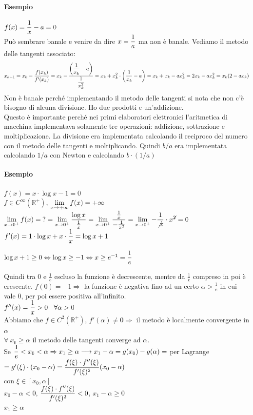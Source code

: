 \documentclass[10pt]{book}
\begin{document}
\paragraph{Esempio} $f(x) = \mathlarger{\frac{1}{x}} - a = 0$\\
Può sembrare banale e venire da dire $x = \mathlarger{\frac{1}{a}}$ ma non è banale. Vediamo il metodo delle tangenti associato:\\
$$x_{k+1} = x_k - \frac{f(x_k)}{f'(x_k)} = x_k -  \frac{\mathlarger{\left(\frac{1}{x_k} - a\right)}}{\mathlarger{\frac{1}{x_k^2}}} = x_k + x_k^2\cdot\left(\frac{1}{x_k} - a \right) = x_k + x_k - ax_k^2 = 2x_k - ax_k^2 = x_k(2 - ax_k)$$
Non è banale perché implementando il metodo delle tangenti si nota che non c'è bisogno di alcuna divisione. Ho due prodotti e un'addizione.\\
Questo è importante perché nei primi elaboratori elettronici l'aritmetica di macchina implementava solamente tre operazioni: addizione, sottrazione e moltiplicazione. La divisione era implementata calcolando il reciproco del numero con il metodo delle tangenti e moltiplicando. Quindi $b/a$ era implementata calcolando $1/a$ con Newton e calcolando $b\cdot(1/a)$
\paragraph{Esempio} $f(x) = x\cdot\log x - 1 = 0$\\
$f \in C^\infty(\mathbb{R}^+)$, $\mathlarger{\lim_{x\to+\infty}f(x) = +\infty}$\\
$\mathlarger{\lim_{x\to0^+}f(x) =\: ?} = \mathlarger{\lim_{x\to0^+} \frac{\log x}{\frac{1}{x}}} = \mathlarger{\lim_{x\to0^+} \frac{\frac{1}{x}}{-\frac{1}{x^2}}} = \mathlarger{\lim_{x\to0^+} -\frac{1}{\not x}\cdot x^{\not 2}} = 0$\\
$f'(x) = 1\cdot\log x + x\cdot\mathlarger{\frac{1}{x}} = \log x + 1$
\begin{list}{}{}
	\item $\log x + 1 \geq 0 \Leftrightarrow \log x \geq -1 \Leftrightarrow x \geq e^{-1} = \mathlarger{\frac{1}{e}}$
\end{list}
Quindi tra $0$ e $\frac{1}{e}$ escluso la funzione è decrescente, mentre da $\frac{1}{e}$ compreso in poi è crescente. $f(0) = -1 \Rightarrow$ la funzione è negativa fino ad un certo $\alpha > \frac{1}{e}$ in cui vale 0, per poi essere positiva all'infinito.\\
$f''(x) = \mathlarger{\frac{1}{x}} > 0\:\:\:\:\forall\alpha > 0$\\
Abbiamo che $f\in C^2(\mathbb{R}^+)$, $f'(\alpha)\neq 0 \Rightarrow$ il metodo è localmente convergente in $\alpha$\\
$\forall\:x_0\geq\alpha$ il metodo delle tangenti converge ad $\alpha$.\\
Se $\mathlarger{\frac{1}{e}} < x_0 < \alpha \Rightarrow x_1 \geq \alpha \longrightarrow x_1 - \alpha = g(x_0) - g(\alpha) =$ per Lagrange $= g'(\xi)\cdot(x_0 - \alpha) = \mathlarger{\frac{f(\xi)\cdot f''(\xi)}{f'(\xi)^2}(x_0 - \alpha)}$\\con $\xi \in [x_0, \alpha]$\\
$x_0 - \alpha < 0$, $\mathlarger{\frac{f(\xi)\cdot f''(\xi)}{f'(\xi)^2}} < 0$, $x_1 - \alpha \geq 0$\\
$x_1 \geq \alpha$
\end{document}
